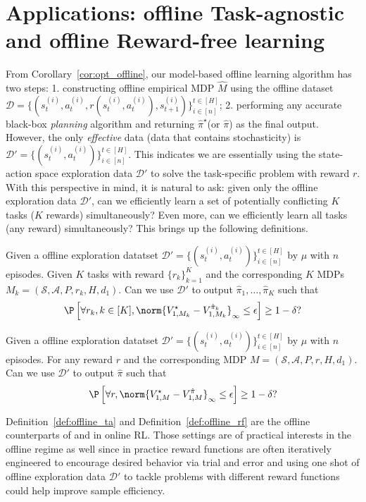 
\section{Applications: offline Task-agnostic and offline Reward-free learning}\label{sec:application}

From Corollary~\ref{cor:opt_offline}, our model-based offline learning algorithm has two steps: 1. constructing offline empirical MDP $\widehat{M}$ using the offline dataset {$\mathcal{D}=\{(s_{t}^{(i)}, a_{t}^{(i)}, r(s_{t}^{(i)}, a_{t}^{(i)}), s_{t+1}^{(i)})\}_{i \in[n]}^{t \in[H]}$}; 2. performing any accurate black-box \emph{planning} algorithm and returning $\widehat{\pi}^\star$(or $\widehat{\pi}$) as the final output. However, the only \emph{effective} data (data that contains stochasticity) is $\mathcal{D}'=\{(s_{t}^{(i)}, a_{t}^{(i)})\}_{i \in[n]}^{t \in[H]}$. This indicates we are essentially using the state-action space exploration data $\mathcal{D}'$ to solve the task-specific problem with reward $r$. With this perspective in mind, it is natural to ask: given only the offline exploration data $\mathcal{D}'$, can we efficiently learn a set of potentially conflicting $K$ tasks ($K$ rewards) simultaneously? Even more, can we efficiently learn all tasks (any reward) simultaneously? This brings up the following definitions.
\vspace{1em}
\begin{definition}\label{def:offline_ta}
	Given a offline exploration datatset $\mathcal{D}'=\{(s_{t}^{(i)}, a_{t}^{(i)})\}_{i \in[n]}^{t \in[H]}$ by $\mu$ with $n$ episodes. Given $K$ tasks with reward $\{r_k\}_{k=1}^K$ and the corresponding $K$ MDPs $M_k=(\mathcal{S}, \mathcal{A}, P, r_k, H, d_1)$. Can we use $\mathcal{D}'$ to output $\hat{\pi}_1,\ldots,\hat{\pi}_K$ such that 
	\[
	\P\left[\forall r_k,k\in[K], \norm{V^\star_{1,M_k}-V^{\hat{\pi}_k}_{1,M_k}}_\infty\leq\epsilon\right]\geq 1-\delta?
	\]
\end{definition}
\begin{definition}\label{def:offline_rf}
	Given a offline exploration datatset $\mathcal{D}'=\{(s_{t}^{(i)}, a_{t}^{(i)})\}_{i \in[n]}^{t \in[H]}$ by $\mu$ with $n$ episodes. For any reward $r$ and the corresponding MDP $M=(\mathcal{S}, \mathcal{A}, P, r, H, d_1)$. Can we use $\mathcal{D}'$ to output $\hat{\pi}$ such that 
	\[
	\P\left[\forall r, \norm{V^\star_{1,M}-V^{\hat{\pi}}_{1,M}}_\infty\leq\epsilon\right]\geq 1-\delta?
	\]
\end{definition}
Definition~\ref{def:offline_ta} and Definition~\ref{def:offline_rf} are the offline counterparts of \citet{zhang2020task} and \citet{jin2020reward} in online RL. Those settings are of practical interests in the offline regime as well since in practice reward functions are often iteratively engineered to encourage desired behavior via trial and error and using one shot of offline exploration data $\mathcal{D}'$ to tackle problems with different reward functions could help improve sample efficiency. 

